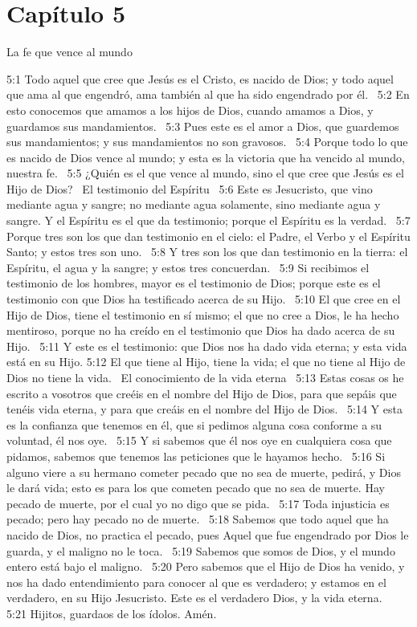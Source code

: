 \section*{Capítulo 5 }
La fe que vence al mundo  

5:1 Todo aquel que cree que Jesús es el Cristo, es nacido de Dios; y todo aquel que ama al que engendró, ama también al que ha sido engendrado por él.  
5:2 En esto conocemos que amamos a los hijos de Dios, cuando amamos a Dios, y guardamos sus mandamientos.  
5:3 Pues este es el amor a Dios, que guardemos sus mandamientos; y sus mandamientos no son gravosos.  
5:4 Porque todo lo que es nacido de Dios vence al mundo; y esta es la victoria que ha vencido al mundo, nuestra fe.  
5:5 ¿Quién es el que vence al mundo, sino el que cree que Jesús es el Hijo de Dios?  
El testimonio del Espíritu  
5:6 Este es Jesucristo, que vino mediante agua y sangre; no mediante agua solamente, sino mediante agua y sangre. Y el Espíritu es el que da testimonio; porque el Espíritu es la verdad.  
5:7 Porque tres son los que dan testimonio en el cielo: el Padre, el Verbo y el Espíritu Santo; y estos tres son uno.  
5:8 Y tres son los que dan testimonio en la tierra: el Espíritu, el agua y la sangre; y estos tres concuerdan.  
5:9 Si recibimos el testimonio de los hombres, mayor es el testimonio de Dios; porque este es el testimonio con que Dios ha testificado acerca de su Hijo.  
5:10 El que cree en el Hijo de Dios, tiene el testimonio en sí mismo; el que no cree a Dios, le ha hecho mentiroso, porque no ha creído en el testimonio que Dios ha dado acerca de su Hijo.  
5:11 Y este es el testimonio: que Dios nos ha dado vida eterna; y esta vida está en su Hijo. 
5:12 El que tiene al Hijo, tiene la vida; el que no tiene al Hijo de Dios no tiene la vida.  
El conocimiento de la vida eterna  
5:13 Estas cosas os he escrito a vosotros que creéis en el nombre del Hijo de Dios, para que sepáis que tenéis vida eterna, y para que creáis en el nombre del Hijo de Dios.  
5:14 Y esta es la confianza que tenemos en él, que si pedimos alguna cosa conforme a su voluntad, él nos oye.  
5:15 Y si sabemos que él nos oye en cualquiera cosa que pidamos, sabemos que tenemos las peticiones que le hayamos hecho.  
5:16 Si alguno viere a su hermano cometer pecado que no sea de muerte, pedirá, y Dios le dará vida; esto es para los que cometen pecado que no sea de muerte. Hay pecado de muerte, por el cual yo no digo que se pida.  
5:17 Toda injusticia es pecado; pero hay pecado no de muerte.  
5:18 Sabemos que todo aquel que ha nacido de Dios, no practica el pecado, pues Aquel que fue engendrado por Dios le guarda, y el maligno no le toca.  
5:19 Sabemos que somos de Dios, y el mundo entero está bajo el maligno.  
5:20 Pero sabemos que el Hijo de Dios ha venido, y nos ha dado entendimiento para conocer al que es verdadero; y estamos en el verdadero, en su Hijo Jesucristo. Este es el verdadero Dios, y la vida eterna.  
5:21 Hijitos, guardaos de los ídolos. Amén.